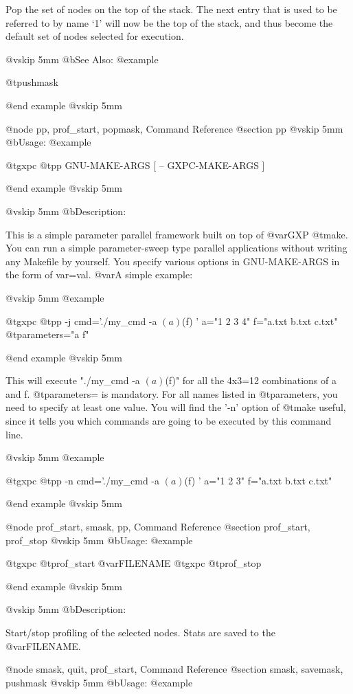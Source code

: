   Pop the set of nodes on the top of the stack. The next entry
that is used to be referred to by name `1' will now be the top
of the stack, and thus become the default set of nodes selected
for execution.

@vskip 5mm
@b{See Also:}
@example

  @t{pushmask}

@end example
@vskip 5mm

@node pp, prof_start, popmask, Command Reference
@section pp
@vskip 5mm
@b{Usage:}
@example

  @t{gxpc} @t{pp} GNU-MAKE-ARGS [ -- GXPC-MAKE-ARGS ]

@end example
@vskip 5mm

@vskip 5mm
@b{Description:}


  This is a simple parameter parallel framework built on top of @var{GXP} @t{make}.
You can run a simple parameter-sweep type parallel applications without 
writing any Makefile by yourself.  You specify various options in GNU-MAKE-ARGS 
in the form of var=val.  @var{A} simple example:

@vskip 5mm
@example

  @t{gxpc} @t{pp} -j cmd='./my_cmd -a $(a) $(f) ' a="1 2 3 4" f="a.txt b.txt c.txt" @t{parameters}="a f"

@end example
@vskip 5mm

This will execute "./my_cmd -a $(a) $(f)" for all the 4x3=12 combinations
of a and f. @t{parameters}= is mandatory.  For all names listed in @t{parameters},
you need to specify at least one value.  You will find the '-n' option of 
@t{make} useful, since it tells you which commands are going to be executed by 
this command line.

@vskip 5mm
@example

  @t{gxpc} @t{pp} -n cmd='./my_cmd -a $(a) $(f) ' a="1 2 3" f="a.txt b.txt c.txt"

@end example
@vskip 5mm


@node prof_start, smask, pp, Command Reference
@section prof_start, prof_stop
@vskip 5mm
@b{Usage:}
@example

  @t{gxpc} @t{prof_start} @var{FILENAME}
  @t{gxpc} @t{prof_stop}

@end example
@vskip 5mm

@vskip 5mm
@b{Description:}


  Start/stop profiling of the selected nodes. Stats are saved to
the @var{FILENAME}.

@node smask, quit, prof_start, Command Reference
@section smask, savemask, pushmask
@vskip 5mm
@b{Usage:}
@example

